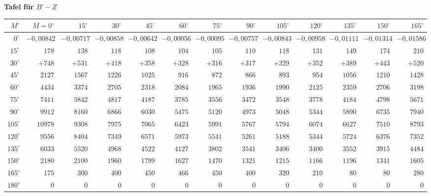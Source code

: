 \documentclass[10pt,a4paper]{article}
\begin{document}
\begin{center}
\textbf{Tafel für $B' - Z$}

\begin{longtable}{r|r|r|r|r|r|r|r|r|r|r|r|r}
\hline
$M'$ & $M=0^{\circ}$ & $15^{\circ}$ & $30^{\circ}$ & $45^{\circ}$ & $60^{\circ}$ & $75^{\circ}$ & $90^{\circ}$ & $105^{\circ}$ & $120^{\circ}$ & $135^{\circ}$ & $150^{\circ}$ & $165^{\circ}$ \\
\hline
\endhead
$0^{\circ}$ & $-0,00842$ & $-0,00717$ & $-0,00858$ & $-0,00642$ & $-0,00056$ & $-0,00095$ & $-0,00757$ & $-0,00843$ & $-0,00958$ & $-0,01111$ & $-0,01314$ & $-0,01586$ \\
$15^{\circ}$ & $178$ & $138$ & $118$ & $108$ & $104$ & $105$ & $110$ & $118$ & $131$ & $149$ & $174$ & $210$ \\
$30^{\circ}$ & $+748$ & $+531$ & $+418$ & $+358$ & $+328$ & $+316$ & $+317$ & $+329$ & $+352$ & $+389$ & $+443$ & $+520$ \\
$45^{\circ}$ & $2127$ & $1567$ & $1226$ & $1025$ & $916$ & $872$ & $866$ & $893$ & $954$ & $1056$ & $1210$ & $1428$ \\
$60^{\circ}$ & $4434$ & $3374$ & $2705$ & $2318$ & $2084$ & $1965$ & $1936$ & $1990$ & $2125$ & $2359$ & $2706$ & $3198$ \\
$75^{\circ}$ & $7411$ & $5842$ & $4817$ & $4187$ & $3785$ & $3556$ & $3472$ & $3548$ & $3778$ & $4184$ & $4798$ & $5671$ \\
$90^{\circ}$ & $9912$ & $8160$ & $6866$ & $6030$ & $5475$ & $5120$ & $4973$ & $5048$ & $5344$ & $5890$ & $6735$ & $7940$ \\
$105^{\circ}$ & $10978$ & $9308$ & $7975$ & $7065$ & $6423$ & $5991$ & $5767$ & $5794$ & $6074$ & $6627$ & $7510$ & $8793$ \\
$120^{\circ}$ & $9556$ & $8404$ & $7349$ & $6571$ & $5973$ & $5541$ & $5261$ & $5188$ & $5344$ & $5724$ & $6376$ & $7352$ \\
$135^{\circ}$ & $6033$ & $5520$ & $4968$ & $4522$ & $4127$ & $3802$ & $3541$ & $3406$ & $3400$ & $3552$ & $3915$ & $4484$ \\
$150^{\circ}$ & $2180$ & $2100$ & $1960$ & $1799$ & $1627$ & $1470$ & $1321$ & $1215$ & $1166$ & $1196$ & $1341$ & $1605$ \\
$165^{\circ}$ & $175$ & $300$ & $400$ & $450$ & $466$ & $450$ & $400$ & $320$ & $210$ & $80$ & $80$ & $280$ \\
$180^{\circ}$ & $0$ & $0$ & $0$ & $0$ & $0$ & $0$ & $0$ & $0$ & $0$ & $0$ & $0$ & $0$ \\
\hline
\end{longtable}
\end{center}
\end{document}

